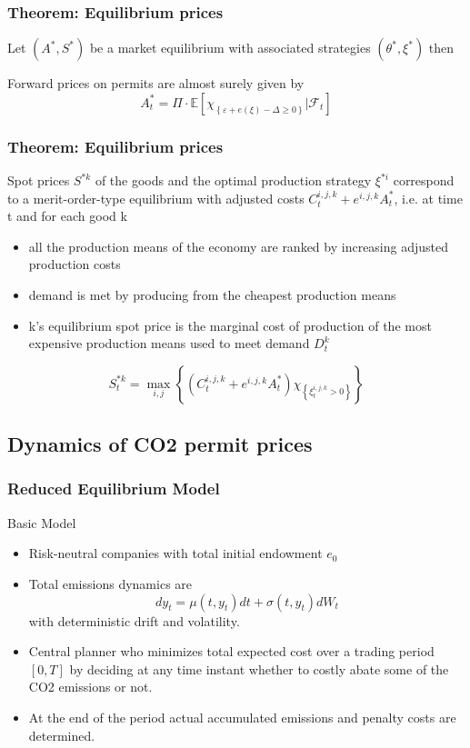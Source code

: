 \begin{frame}\frametitle{Theorem: Equilibrium prices}
Let $(A^*,S^*)$ be a market equilibrium with associated strategies $(\theta^*,\xi^*)$ then

Forward prices on permits are almost surely given by \[
A^*_t = \Pi \cdot \mathbb{E} \left[ \chi_{\left\{ \varepsilon + e(\xi) - \Delta \ge 0 \right\}} | \mathcal{F}_t \right]
\]

\end{frame}


\begin{frame}\frametitle{Theorem: Equilibrium prices}
 Spot prices $S^{*k}$ of the goods and the optimal production strategy $\xi^{*i}$ correspond to a merit-order-type equilibrium with adjusted costs $C_t^{i,j,k} + e^{i,j,k} A_t^*$, i.e. at time t and for each good k
\begin{itemize}
\item all the production means of the economy are ranked by increasing adjusted production costs
\item demand is met by producing from the cheapest production means
\item k's equilibrium spot price is the marginal cost of production of the most expensive production means used to meet demand $D_t^k$
\end{itemize}
\[
S_t^{*k} = \max_{i,j} \left\{ \left(C_t^{i,j,k} + e^{i,j,k} A_t^* \right) \chi_{\left\{\xi_t^{i,j,k}>0\right\}}\right\}
\]
\end{frame}

\subsection{Dynamics of CO2 permit prices}
\subsubsection{Reduced Equilibrium Model}

{Basic Model}
\begin{itemize}
\item<1-> Risk-neutral companies with total initial endowment $e_0$
\item<2-> Total emissions dynamics are
\begin{equation}
dy_t= \mu(t, y_t)dt + \sigma(t, y_t)dW_t
\end{equation}
with deterministic drift and volatility.
\item<3-> Central planner who minimizes total expected cost over a trading period $[0,T]$ by deciding at any time instant
whether to costly abate some of the CO2 emissions or not.
\item<4-> At the end of the period actual accumulated emissions and penalty costs are determined.
\end{itemize}



